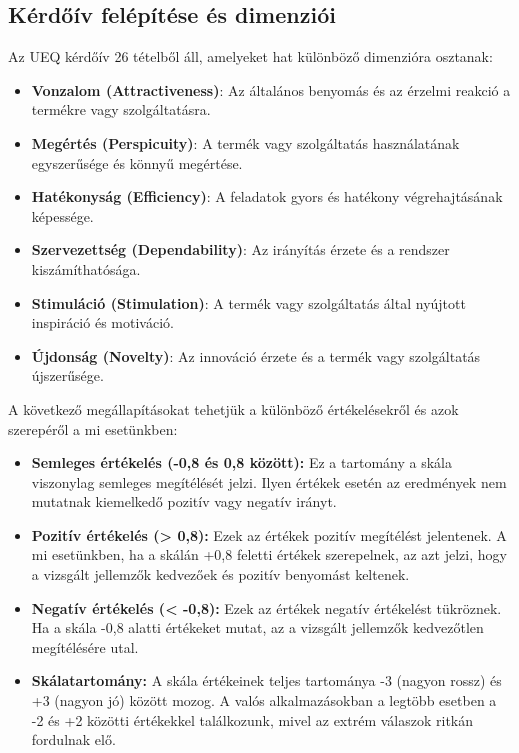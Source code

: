 \subsection{Kérdőív felépítése és dimenziói}

Az UEQ kérdőív 26 tételből áll, amelyeket hat különböző dimenzióra osztanak:

\begin{itemize}
    \item \textbf{Vonzalom (Attractiveness)}: Az általános benyomás és az érzelmi reakció a termékre vagy szolgáltatásra.
    \item \textbf{Megértés (Perspicuity)}: A termék vagy szolgáltatás használatának egyszerűsége és könnyű megértése.
    \item \textbf{Hatékonyság (Efficiency)}: A feladatok gyors és hatékony végrehajtásának képessége.
    \item \textbf{Szervezettség (Dependability)}: Az irányítás érzete és a rendszer kiszámíthatósága.
    \item \textbf{Stimuláció (Stimulation)}: A termék vagy szolgáltatás által nyújtott inspiráció és motiváció.
    \item \textbf{Újdonság (Novelty)}: Az innováció érzete és a termék vagy szolgáltatás újszerűsége.
\end{itemize}

A következő megállapításokat tehetjük a különböző értékelésekről és azok szerepéről a mi esetünkben:

\begin{itemize}
    \item \textbf{Semleges értékelés (-0,8 és 0,8 között):} Ez a tartomány a skála viszonylag semleges megítélését jelzi. Ilyen értékek esetén az eredmények nem mutatnak kiemelkedő pozitív vagy negatív irányt.
    
    \item \textbf{Pozitív értékelés (> 0,8):} Ezek az értékek pozitív megítélést jelentenek. A mi esetünkben, ha a skálán +0,8 feletti értékek szerepelnek, az azt jelzi, hogy a vizsgált jellemzők kedvezőek és pozitív benyomást keltenek.
    
    \item \textbf{Negatív értékelés (< -0,8):} Ezek az értékek negatív értékelést tükröznek. Ha a skála -0,8 alatti értékeket mutat, az a vizsgált jellemzők kedvezőtlen megítélésére utal.
    
    \item \textbf{Skálatartomány:} A skála értékeinek teljes tartománya -3 (nagyon rossz) és +3 (nagyon jó) között mozog. A valós alkalmazásokban a legtöbb esetben a -2 és +2 közötti értékekkel találkozunk, mivel az extrém válaszok ritkán fordulnak elő.
\end{itemize}

